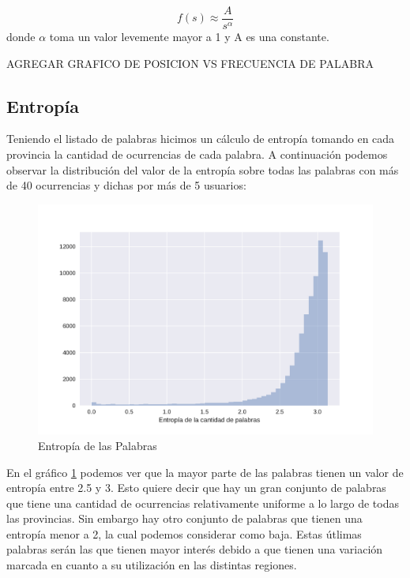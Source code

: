 $$f(s) \approx \frac{A}{s^{\alpha}}$$
donde $\alpha$ toma un valor levemente mayor a 1 y A es una constante.

AGREGAR GRAFICO DE POSICION VS FRECUENCIA DE PALABRA




\subsection{Entropía}
Teniendo el listado de palabras hicimos un cálculo de entropía tomando en cada provincia la cantidad de ocurrencias de cada palabra. A continuación podemos observar la distribución del valor de la entropía sobre todas las palabras con más de 40 ocurrencias y dichas por más de 5 usuarios:


\begin{figure}[ht]
\centering
\includegraphics[scale=0.4]{./images/DistribucionEntropia.pdf}
\caption{Entropía de las Palabras} 
\label{fig:entropiaPalabras} 
\end{figure}

En el gráfico \ref{fig:entropiaPalabras} podemos ver que la mayor parte de las palabras tienen un valor de entropía entre 2.5 y 3. Esto quiere decir que hay un gran conjunto de palabras que tiene una cantidad de ocurrencias relativamente uniforme a lo largo de todas las provincias. Sin embargo hay otro conjunto de palabras que tienen una entropía menor a 2, la cual podemos considerar como baja. Estas útlimas palabras serán las que tienen mayor interés debido a que tienen una variación marcada en cuanto a su utilización en las distintas regiones.


